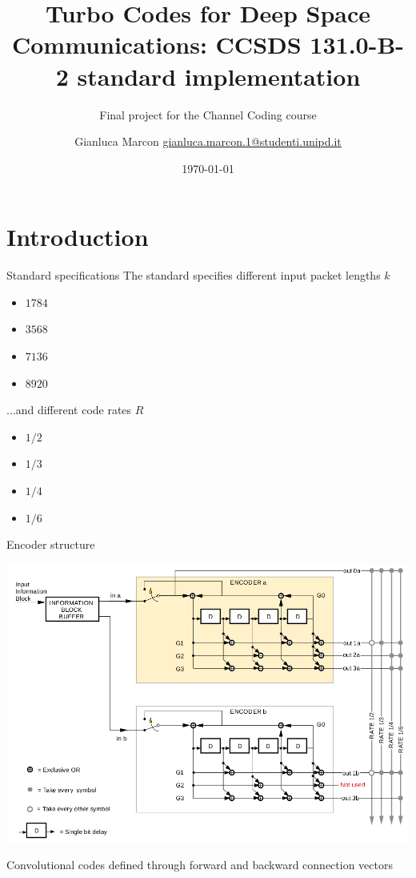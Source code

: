 \documentclass[xcolor={usenames,dvipsnames},11pt]{beamer}
\title{ \Large Turbo Codes for Deep Space Communications: CCSDS 131.0-B-2 standard implementation}
\subtitle{Final project for the Channel Coding course}
\author[G. Marcon]{Gianluca Marcon \hfill \href{mailto:gianluca.marcon.1@studenti.unipd.it}{gianluca.marcon.1@studenti.unipd.it}}
\date{\today}
\institute{University of Padova}
\begin{document}
\maketitle

\section{Introduction}
\begin{frame}{Standard specifications}
    The standard specifies different input packet lengths $k$
    \begin{itemize}
        \item $1784$
        \item $3568$
        \item $7136$
        \item $8920$
    \end{itemize}\pause

    ...and different code rates $R$
    \begin{itemize}
        \item $1/2$
        \item $1/3$
        \item $1/4$
        \item $1/6$
    \end{itemize}    
\end{frame}
\begin{frame}{Encoder structure}
    \begin{center}
        \includegraphics[height=0.75\textheight]{./images/encoder-structure}
    \end{center}
    Convolutional codes defined through forward and backward connection vectors
\end{frame}
\end{document}
